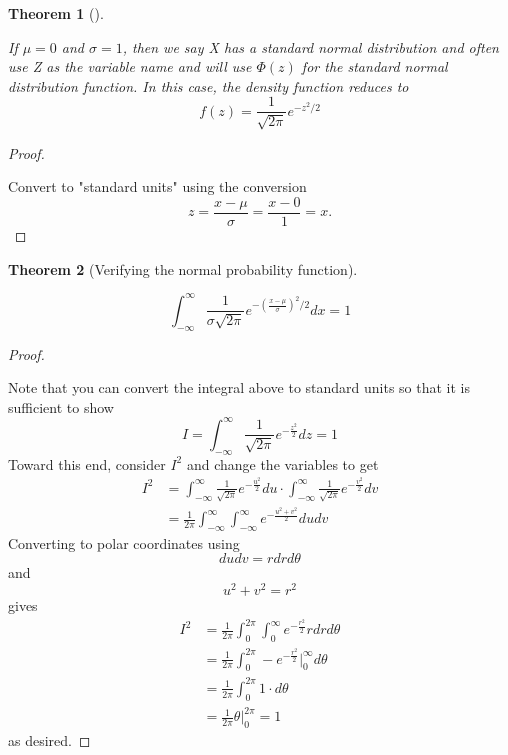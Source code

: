 \documentclass[10pt,]{book}
\theoremstyle{plain}
\newtheorem{theorem}{Theorem}[section]
\theoremstyle{definition}
\theoremstyle{definition}
\theoremstyle{definition}
\numberwithin{equation}{section}
\begin{document}
	\begin{theorem}[{}]\label{theorem-55}

If \(\mu = 0\) and \(\sigma = 1\), then we say X has a standard normal distribution and often use Z as the variable name and will use \(\Phi(z)\) for the standard normal distribution function. In this case, the density function reduces to
		\begin{equation*}f(z) = \frac{1}{\sqrt{2 \pi}} e^{ -z^2 / 2}\end{equation*}
\end{theorem}
\begin{proof}\hypertarget{proof-54}{}
Convert to "standard units" using the conversion 
			\begin{equation*}z = \frac{x-\mu}{\sigma} = \frac{x-0}{1} = x.\end{equation*}
\end{proof}


	\begin{theorem}[{Verifying the normal probability function}]\label{theorem-56}

		\begin{equation*}\int_{-\infty}^{\infty} \frac{1}{\sigma \sqrt{2 \pi}} e^{ -\left ( \frac{x-\mu}{\sigma} \right ) ^2 / 2} dx = 1\end{equation*}
\end{theorem}
\begin{proof}\hypertarget{proof-55}{}
Note that you can convert the integral above to standard units so that it is sufficient to show
\begin{equation*}I = \int_{-\infty}^{\infty} \frac{1}{\sqrt{2 \pi}} e^{ -\frac{z^2}{2} } dz = 1\end{equation*}
Toward this end, consider \(I^2\) and change the variables to get
\begin{align*}
I^2 & = \int_{-\infty}^{\infty} \frac{1}{\sqrt{2 \pi}} e^{ -\frac{u^2}{2} } du \cdot \int_{-\infty}^{\infty} \frac{1}{\sqrt{2 \pi}} e^{ -\frac{v^2}{2} } dv\\
& = \frac{1}{2 \pi} \int_{-\infty}^{\infty} \int_{-\infty}^{\infty} e^{ -\frac{u^2+v^2}{2} } du dv
\end{align*}
Converting to polar coordinates using 
\begin{equation*} du dv = r dr d\theta \end{equation*} and
\begin{equation*} u^2 + v^2 = r^2\end{equation*}
gives
\begin{align*}
I^2 & = \frac{1}{2 \pi} \int_0^{2 \pi} \int_0^{\infty} e^{ -\frac{r^2}{2} } r dr d\theta\\
 & = \frac{1}{2 \pi} \int_0^{2 \pi} -e^{ -\frac{r^2}{2} } \big |_0^{\infty} d\theta\\
 & = \frac{1}{2 \pi} \int_0^{2 \pi} 1 \cdot d\theta\\
 & = \frac{1}{2 \pi} \theta \big |_0^{2 \pi} = 1
\end{align*}
as desired.
%
\end{proof}
\end{document}
